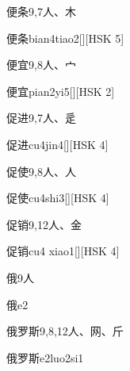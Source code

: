 \begin{entry}{便条}{9,7}{⼈、⽊}
  \begin{phonetics}{便条}{bian4tiao2}[][HSK 5]
  \end{phonetics}
\end{entry}

\begin{entry}{便宜}{9,8}{⼈、⼧}
  \begin{phonetics}{便宜}{pian2yi5}[][HSK 2]
  \end{phonetics}
\end{entry}

\begin{entry}{促进}{9,7}{⼈、⾡}
  \begin{phonetics}{促进}{cu4jin4}[][HSK 4]
  \end{phonetics}
\end{entry}

\begin{entry}{促使}{9,8}{⼈、⼈}
  \begin{phonetics}{促使}{cu4shi3}[][HSK 4]
  \end{phonetics}
\end{entry}

\begin{entry}{促销}{9,12}{⼈、⾦}
  \begin{phonetics}{促销}{cu4 xiao1}[][HSK 4]
  \end{phonetics}
\end{entry}

\begin{entry}{俄}{9}{⼈}
  \begin{phonetics}{俄}{e2}
  \end{phonetics}
\end{entry}

\begin{entry}{俄罗斯}{9,8,12}{⼈、⽹、⽄}
  \begin{phonetics}{俄罗斯}{e2luo2si1}
  \end{phonetics}
\end{entry}


